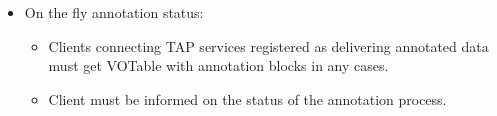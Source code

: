 \begin {itemize}
  \item On the fly annotation status:
      \begin {itemize} 
          \item Clients connecting TAP services registered as delivering annotated data must get VOTable with annotation blocks in any cases. 
          \item Client must be informed on the status of the annotation process.          
       \end {itemize}

\end {itemize}
